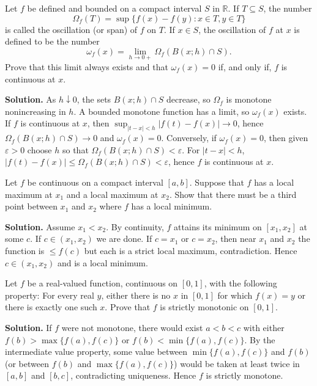 \begin{problembox}
Let \( f \) be defined and bounded on a compact interval \( S \) in \( \mathbb{R} \). If \( T \subseteq S \), the number
\[\Omega_f(T) = \sup \{f(x) - f(y) : x \in T, y \in T\}\]
is called the oscillation (or span) of \( f \) on \( T \). If \( x \in S \), the oscillation of \( f \) at \( x \) is defined to be the number
\[\omega_f(x) = \lim_{h \to 0+} \Omega_f(B(x; h) \cap S).\]
Prove that this limit always exists and that \( \omega_f(x) = 0 \) if, and only if, \( f \) is continuous at \( x \).
\end{problembox}

\noindent\textbf{Solution.}
As $h\downarrow 0$, the sets $B(x;h)\cap S$ decrease, so $\Omega_f$ is monotone nonincreasing in $h$. A bounded monotone function has a limit, so $\omega_f(x)$ exists. If $f$ is continuous at $x$, then $\sup_{|t-x|<h}|f(t)-f(x)|\to 0$, hence $\Omega_f(B(x;h)\cap S)\to 0$ and $\omega_f(x)=0$. Conversely, if $\omega_f(x)=0$, then given $\varepsilon>0$ choose $h$ so that $\Omega_f(B(x;h)\cap S)<\varepsilon$. For $|t-x|<h$, $|f(t)-f(x)|\le \Omega_f(B(x;h)\cap S)<\varepsilon$, hence $f$ is continuous at $x$.
\medskip

\begin{problembox}
Let \( f \) be continuous on a compact interval \([a, b]\). Suppose that \( f \) has a local maximum at \( x_1 \) and a local maximum at \( x_2 \). Show that there must be a third point between \( x_1 \) and \( x_2 \) where \( f \) has a local minimum.
\end{problembox}

\noindent\textbf{Solution.}
Assume $x_1<x_2$. By continuity, $f$ attains its minimum on $[x_1,x_2]$ at some $c$. If $c\in(x_1,x_2)$ we are done. If $c=x_1$ or $c=x_2$, then near $x_1$ and $x_2$ the function is $\le f(c)$ but each is a strict local maximum, contradiction. Hence $c\in(x_1,x_2)$ and is a local minimum.
\medskip

\begin{problembox}
Let \( f \) be a real-valued function, continuous on \([0, 1]\), with the following property: For every real \( y \), either there is no \( x \) in \([0, 1]\) for which \( f(x) = y \) or there is exactly one such \( x \). Prove that \( f \) is strictly monotonic on \([0, 1]\).
\end{problembox}

\noindent\textbf{Solution.}
If $f$ were not monotone, there would exist $a<b<c$ with either $f(b)>\max\{f(a),f(c)\}$ or $f(b)<\min\{f(a),f(c)\}$. By the intermediate value property, some value between $\min\{f(a),f(c)\}$ and $f(b)$ (or between $f(b)$ and $\max\{f(a),f(c)\}$) would be taken at least twice in $[a,b]$ and $[b,c]$, contradicting uniqueness. Hence $f$ is strictly monotone.
\medskip

